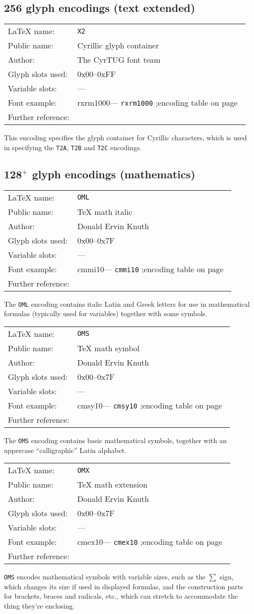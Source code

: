 \documentclass{ltxguide}[1994/11/20]
\makeatletter
\providecommand{\Enc}[1]{\texttt{#1}}
\newenvironment{encodinginfo}[7]%
  {\noindent
   \begin{tabularx}{\linewidth}{@{}l>{\raggedright\let\\\tabularnewline}X}%
     \LaTeX{} name:          & \texttt{#1}\\%
     Public name:          & #2\\%
     Author:                   & #3\\%
     Glyph slots used: & #4\\%
     Variable slots:     & #5\\%
     Font example:     & \def\@tempa{#6}\ifx\@tempa\@empty---%
                            \else\texttt{#6}\referenceftable{#6}\fi\\%
     Further reference:                & #7%
   \end{tabularx}%
   \par\nobreak
   \vspace*{3pt}%
   \quote
  }%
  {\endquote
   \vspace{6pt}}
\def\referenceftable#1{
  \@ifundefined{r@fonttable:#1}%
  \relax
  {;\space encoding table on page~\pageref{fonttable:#1}}%
}
\makeatother
\begin{document}
\subsection{256 glyph encodings (text extended)}
\label{sec:extendedenc}

\begin{encodinginfo}
  {X2}
  {Cyrillic glyph container}
  {The CyrTUG font team}
  {0x00--0xFF}
  {---}
  {rxrm1000}
  {\cite{Berdnikov:eurotex-98}}

  This encoding specifies the glyph container for Cyrillic characters,
  which is used in specifying the \Enc{T2A}, \Enc{T2B} and \Enc{T2C} encodings.
\end{encodinginfo}




\subsection{128$^+$ glyph encodings (mathematics)}


\begin{encodinginfo}{OML}
        {\TeX{} math italic}
        {Donald Ervin Knuth}
        {0x00--0x7F}
        {---}
        {cmmi10}
        {\cite[p.430]{A-W:DKn86}}

  The \Enc{OML} encoding contains italic Latin and Greek letters for
  use in mathematical formulas (typically used for variables) together
  with some symbols.

\end{encodinginfo}

\begin{encodinginfo}{OMS}
        {\TeX{} math symbol}
        {Donald Ervin Knuth}
        {0x00--0x7F}
        {---}
        {cmsy10}
        {\cite[p.431]{A-W:DKn86}}

  The  \Enc{OMS} encoding contains basic mathematical symbols,
  together with an uppercase ``calligraphic'' Latin alphabet.
\end{encodinginfo}


\begin{encodinginfo}{OMX}
        {\TeX{} math extension}
        {Donald Ervin Knuth}
        {0x00--0x7F}
        {---}
        {cmex10}
        {\cite[p.432]{A-W:DKn86}}

  \Enc{OMS} encodes mathematical symbols with variable sizes, such as
  the $\sum$ sign, which changes its size if used in displayed
  formulas, and the construction parts for
  brackets, braces and radicals, etc., which can stretch to accommodate
  the thing they're enclosing.

\end{encodinginfo}
\end{document}

